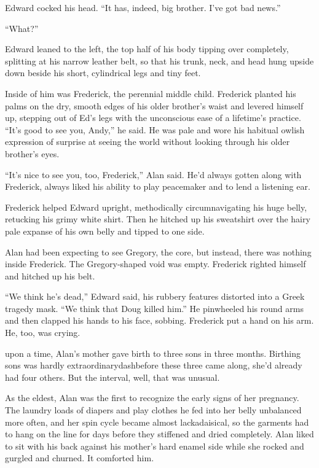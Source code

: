 Edward cocked his head.  ``It has, indeed, big brother.  I've got bad
news.''

``What?''

Edward leaned to the left, the top half of his body tipping over
completely, splitting at his narrow leather belt, so that his trunk,
neck, and head hung upside down beside his short, cylindrical legs and
tiny feet.

Inside of him was Frederick, the perennial middle child.  Frederick
planted his palms on the dry, smooth edges of his older brother's
waist and levered himself up, stepping out of Ed's legs with the
unconscious ease of a lifetime's practice.  ``It's good to see you,
Andy,'' he said.  He was pale and wore his habitual owlish expression
of surprise at seeing the world without looking through his older
brother's eyes.

``It's nice to see you, too, Frederick,'' Alan said.  He'd always
gotten along with Frederick, always liked his ability to play
peacemaker and to lend a listening ear.

Frederick helped Edward upright, methodically circumnavigating his
huge belly, retucking his grimy white shirt.  Then he hitched up his
sweatshirt over the hairy pale expanse of his own belly and tipped to
one side.

Alan had been expecting to see Gregory, the core, but instead, there
was nothing inside Frederick.  The Gregory-shaped void was empty. 
Frederick righted himself and hitched up his belt.

``We think he's dead,'' Edward said, his rubbery features distorted
into a Greek tragedy mask.  ``We think that Doug killed him.'' He
pinwheeled his round arms and then clapped his hands to his face,
sobbing.  Frederick put a hand on his arm.  He, too, was crying.

 upon a time, Alan's mother gave birth to three sons in three
months.  Birthing sons was hardly extraordinarydash{}before these three
came along, she'd already had four others.  But the interval, well,
that was unusual.

As the eldest, Alan was the first to recognize the early signs of her
pregnancy.  The laundry loads of diapers and play clothes he fed into
her belly unbalanced more often, and her spin cycle became almost
lackadaisical, so the garments had to hang on the line for days before
they stiffened and dried completely.  Alan liked to sit with his back
against his mother's hard enamel side while she rocked and gurgled and
churned.  It comforted him.

